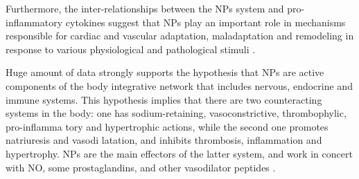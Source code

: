 \documentclass[14pt,a4paper,onecolumn]{extarticle}
\begin{document}



Furthermore, the inter-relationships between the NPs system and pro-inflammatory cytokines suggest that NPs play an important role in mechanisms responsible for cardiac and vascular adaptation, maladaptation and remodeling in response to various physiological and pathological stimuli \citep{35}.


Huge amount of data strongly supports the hypothesis that NPs are active components of the body integrative network that includes nervous, endocrine and immune systems. This hypothesis implies that there are two counteracting systems in the body: one has sodium-retaining, vasoconstrictive, thrombophylic, pro-inflamma tory and hypertrophic actions, while the second one promotes natriuresis and vasodi latation, and inhibits thrombosis, inflammation and hypertrophy. NPs are the main effectors of the latter system, and work in concert with NO, some prostaglandins, and other vasodilator peptides \citep{120}.
\end{document}
